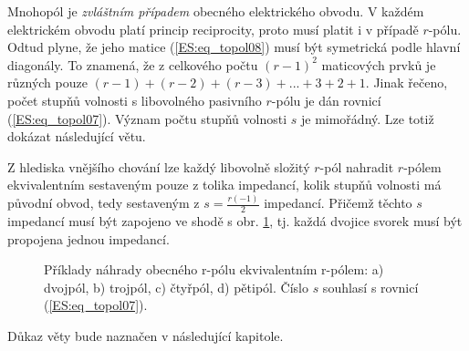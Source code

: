       Mnohopól je \emph{zvláštním případem} obecného elektrického obvodu. V každém elektrickém 
      obvodu platí princip reciprocity, proto musí platit i v případě \(r\)-pólu. Odtud plyne, že 
      jeho matice (\ref{ES:eq_topol08}) musí být symetrická podle hlavní diagonály. To znamená, že 
      z celkového počtu \((r-1)^2\) maticových prvků je různých pouze \((r-1) + (r-2) + (r-3) +... 
      + 3 + 2 + 1\). Jinak řečeno, počet stupňů volnosti s libovolného pasivního \(r\)-pólu je dán 
      rovnicí (\ref{ES:eq_topol07}). Význam počtu stupňů volnosti \(s\) je mimořádný. Lze totiž 
      dokázat následující větu.
      
      \begin{lemma}\label{ES:lem_topol01}
        Z hlediska vnějšího chování lze každý libovolně složitý \(r\)-pól nahradit \(r\)-pólem
        ekvivalentním sestaveným pouze z tolika impedancí, kolik stupňů volnosti má původní obvod, 
        tedy sestaveným z \(s = \frac{r(-1)}{2}\) impedancí. Přičemž těchto \(s\) impedancí musí 
        být zapojeno ve shodě s obr. \ref{es:fig_patocka_topol05}, tj. každá dvojice svorek musí 
        být propojena jednou impedancí.
        \begin{figure}[ht!]
          \centering  
          \caption{Příklady náhrady obecného r-pólu ekvivalentním r-pólem: a) dvojpól, b) trojpól,
                   c) čtyřpól, d) pětipól. Číslo \(s\) souhlasí s rovnicí (\ref{ES:eq_topol07}).
                   \cite[s.~47]{Patocka4}} 
          \label{es:fig_patocka_topol05}
        \end{figure}
      \end{lemma}
      Důkaz věty bude naznačen v následující kapitole.
      
